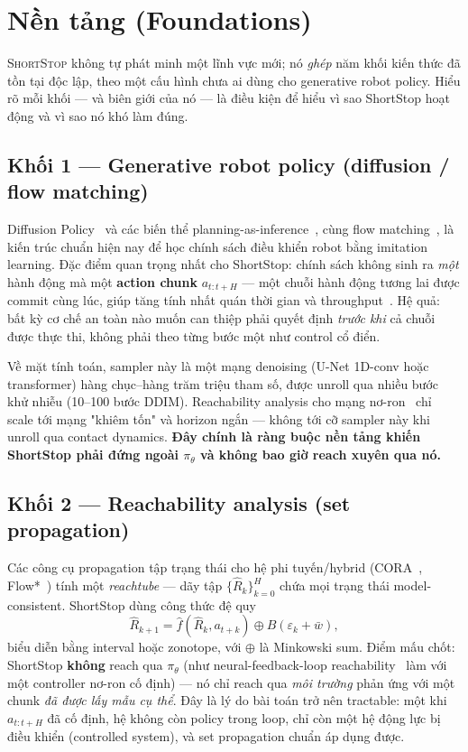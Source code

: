 \documentclass[a4paper,12pt]{article}
\let\stdsection\section
\renewcommand{\section}{\clearpage\stdsection}
\newcommand{\st}{\textsc{ShortStop}}
\begin{document}
\section{Nền tảng (Foundations)}\label{sec:foundations}
\st{} không tự phát minh một lĩnh vực mới; nó \emph{ghép} năm khối kiến thức đã tồn tại độc lập, theo một cấu hình chưa ai dùng cho generative robot policy. Hiểu rõ mỗi khối --- và biên giới của nó --- là điều kiện để hiểu vì sao ShortStop hoạt động và vì sao nó khó làm đúng.

\subsection{Khối 1 --- Generative robot policy (diffusion / flow matching)}
Diffusion Policy~\cite{chi2023diffusion} và các biến thể planning-as-inference~\cite{janner2022planning,ajay2023conditional}, cùng flow matching~\cite{lipman2023flow}, là kiến trúc chuẩn hiện nay để học chính sách điều khiển robot bằng imitation learning. Đặc điểm quan trọng nhất cho ShortStop: chính sách không sinh ra \emph{một} hành động mà một \textbf{action chunk} $a_{t:t+H}$ --- một chuỗi hành động tương lai được commit cùng lúc, giúp tăng tính nhất quán thời gian và throughput~\cite{zhao2023aloha}. Hệ quả: bất kỳ cơ chế an toàn nào muốn can thiệp phải quyết định \emph{trước khi} cả chuỗi được thực thi, không phải theo từng bước một như control cổ điển.

Về mặt tính toán, sampler này là một mạng denoising (U-Net 1D-conv hoặc transformer) hàng chục--hàng trăm triệu tham số, được unroll qua nhiều bước khử nhiễu (10--100 bước DDIM). Reachability analysis cho mạng nơ-ron~\cite{ivanov2019verisig,tran2020nnv,huang2019reachnn,everett2021reachability} chỉ scale tới mạng "khiêm tốn" và horizon ngắn --- không tới cỡ sampler này khi unroll qua contact dynamics. \textbf{Đây chính là ràng buộc nền tảng khiến ShortStop phải đứng ngoài $\pi_\theta$ và không bao giờ reach xuyên qua nó.}

\subsection{Khối 2 --- Reachability analysis (set propagation)}
Các công cụ propagation tập trạng thái cho hệ phi tuyến/hybrid (CORA~\cite{althoff2015cora}, Flow*~\cite{chen2013flowstar}) tính một \emph{reachtube} --- dãy tập $\{\hat R_k\}_{k=0}^H$ chứa mọi trạng thái model-consistent. ShortStop dùng công thức đệ quy
\[
\hat R_{k+1} = \hat f(\hat R_k, a_{t+k}) \oplus B(\varepsilon_k + \bar w),
\]
biểu diễn bằng interval hoặc zonotope, với $\oplus$ là Minkowski sum. Điểm mấu chốt: ShortStop \textbf{không} reach qua $\pi_\theta$ (như neural-feedback-loop reachability~\cite{everett2021reachability} làm với một controller nơ-ron cố định) --- nó chỉ reach qua \emph{môi trường} phản ứng với một chunk \emph{đã được lấy mẫu cụ thể}. Đây là lý do bài toán trở nên tractable: một khi $a_{t:t+H}$ đã cố định, hệ không còn policy trong loop, chỉ còn một hệ động lực bị điều khiển (controlled system), và set propagation chuẩn áp dụng được.
\end{document}
